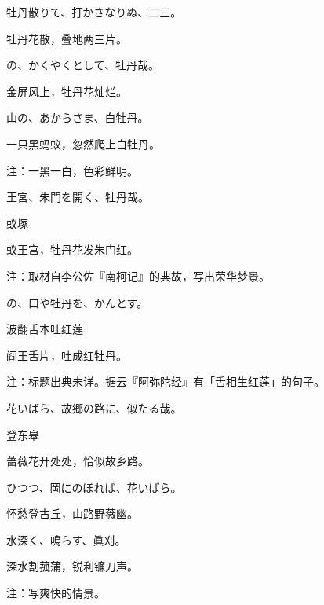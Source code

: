 \begin{haiku}
    {\FH 牡丹散りて、打かさなりぬ、二三。}

    {\FK 牡丹花散，叠地两三片。}
\end{haiku}

\begin{haiku}
    {\FH {}の、かくやくとして、牡丹哉。}

    {\FK 金屏风上，牡丹花灿烂。}
\end{haiku}

\begin{haiku}
    {\FH 山の、あからさま、白牡丹。}

    {\FK 一只黑蚂蚁，忽然爬上白牡丹。}

    {\FT 注：一黑一白，色彩鲜明。}
\end{haiku}

\begin{haiku}
    {\FH {}王宮、朱門を開く、牡丹哉。}

    {\FK 蚁塚}

    {\FK 蚁王宫，牡丹花发朱门红。}

    {\FT 注：取材自李公佐『南柯记』的典故，写出荣华梦景。}
\end{haiku}

\begin{haiku}
    {\FH {}の、口や牡丹を、かんとす。}

    {\FK 波翻舌本吐红莲}

    {\FK 阎王舌片，吐成红牡丹。}

    {\FT 注：标题出典未详。据云『阿弥陀经』有「舌相生红莲」的句子。}
\end{haiku}

\begin{haiku}
    {\FH 花いばら、故郷の路に、似たる哉。}

    {\FK 登东皋}

    {\FK 蔷薇花开处处，恰似故乡路。}
\end{haiku}

\begin{haiku}
    {\FH {}ひつつ、岡にのぼれば、花いばら。}

    {\FK 怀愁登古丘，山路野薇幽。}
\end{haiku}

\begin{haiku}
    {\FH 水深く、鳴らす、眞刈。}

    {\FK 深水割菰蒲，锐利镰刀声。}

    {\FT 注：写爽快的情景。}
\end{haiku}

